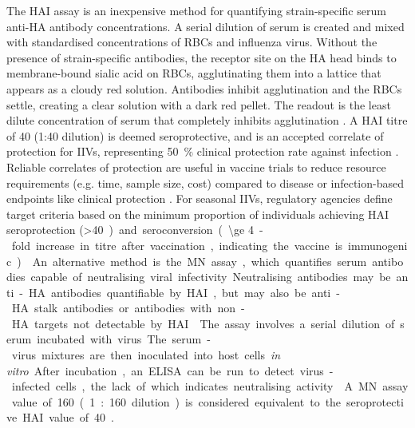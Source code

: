 The \gls{HAI} assay is an inexpensive method for quantifying strain-specific serum anti-\gls{HA} antibody concentrations. 
A serial dilution of serum is created and mixed with standardised concentrations of \glspl{RBC} and influenza virus. 
Without the presence of strain-specific antibodies, the receptor site on the \gls{HA} head binds to membrane-bound sialic acid on \glspl{RBC}, agglutinating them into a lattice that appears as a cloudy red solution.
Antibodies inhibit agglutination and the \glspl{RBC} settle, creating a clear solution with a dark red pellet. 
The readout is the least dilute concentration of serum that completely inhibits agglutination \autocite{klimov2012InfluenzaVirusTitration}.
A \gls{HAI} titre of 40 (1:40 dilution) is deemed seroprotective, and is an accepted correlate of protection for \glspl{IIV},
representing \SI{50}{\percent} clinical protection rate against infection \autocite{cox2013CorrelatesProtectionInfluenza,bresee2018InactivatedInfluenzaVaccines}.
Reliable correlates of protection are useful in vaccine trials to reduce resource requirements (e.g. time, sample size, cost) compared to disease or infection-based endpoints like clinical protection \autocite{pulendran2010SystemsVaccinology}.
For seasonal \glspl{IIV}, regulatory agencies define target criteria based on the
minimum proportion of individuals achieving \gls{HAI} seroprotection (\SI{>40}) 
and seroconversion (\SI{\ge 4}-fold increase in titre after vaccination, indicating the vaccine is immunogenic) \autocite{cox2013CorrelatesProtectionInfluenza,sano2017RoadMoreEffective,krammer2019HumanAntibodyResponse}.

An alternative method is the \gls{MN} assay, which quantifies serum antibodies capable of neutralising viral infectivity.
Neutralising antibodies may be anti-\gls{HA} antibodies quantifiable by \gls{HAI}, but may also be anti-\gls{HA} stalk antibodies or antibodies with non-\gls{HA} targets not detectable by \gls{HAI} \autocite{krammer2019HumanAntibodyResponse}.
The assay involves a serial dilution of serum incubated with virus. 
The serum-virus mixtures are then inoculated into host cells \textit{in vitro}.
After incubation, an \gls{ELISA} can be run to detect virus-infected cells, the lack of which indicates neutralising activity \autocite{klimov2012InfluenzaVirusTitration}.
A \gls{MN} assay value of 160 (1:160 dilution) is considered equivalent to the seroprotective \gls{HAI} value of 40 \autocite{bresee2018InactivatedInfluenzaVaccines}.

